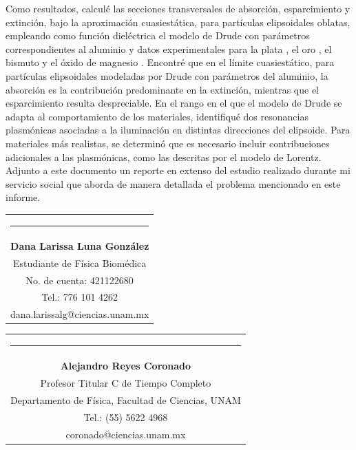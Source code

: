 \documentclass[9pt,letterpaper]{article}
\begin{document}
	Como resultados, calculé las secciones transversales de absorción, esparcimiento y extinción, bajo la aproximación cuasiestática, para partículas elipsoidales oblatas, empleando como función dieléctrica el modelo de Drude con parámetros correspondientes al aluminio \cite{Plasmonics} y datos experimentales para la plata \cite{Plata}, el oro \cite{Plata}, el bismuto \cite{Bismuto} y el óxido de magnesio \cite{MgO}. Encontré que en el límite cuasiestático, para partículas elipsoidales modeladas por Drude con parámetros del aluminio, la absorción es la contribución predominante en la extinción, mientras que el esparcimiento resulta despreciable. En el rango en el que el modelo de Drude se adapta al comportamiento de los materiales, identifiqué dos resonancias plasmónicas asociadas a
	la iluminación en distintas direcciones del elipsoide. Para materiales más realistas, se determinó que es necesario incluir contribuciones adicionales a las plasmónicas, como las descritas por el modelo de Lorentz. \\
	
	Adjunto a este documento un reporte en extenso del estudio realizado durante mi servicio social que aborda de manera detallada el problema mencionado en este informe.	\\
	
	\bigskip
	
	{\vspace{2.55cm}\begin{tabular} { c}
			\setlength{\tabcolsep}{15pt}
			\renewcommand{\arraystretch}{1}
			\noindent\rule{5.5cm}{0.4pt}\qquad \\
			
			\qquad  \textbf{Dana Larissa Luna González} \qquad \\
			\qquad Estudiante de Física Biomédica  \qquad \\ \qquad 
			No. de cuenta: 421122680\qquad \\  
			\qquad  Tel.: 776 101 4262 \qquad \\
			\qquad dana.larissalg@ciencias.unam.mx \qquad \\
			
		\end{tabular}
	}
	
	{\vspace{-2.53cm}\hspace{7cm}\begin{tabular} { c}
			\setlength{\tabcolsep}{15pt}
			\renewcommand{\arraystretch}{1}
			\noindent\rule{5.5cm}{0.4pt}\qquad \\
			
			\qquad  \textbf{Alejandro Reyes Coronado} \qquad \\
			\qquad Profesor Titular C de Tiempo Completo  \qquad \\  
			\qquad Departamento de Física, Facultad de Ciencias, UNAM\qquad \\ 
			\qquad  Tel.: (55) 5622 4968 \qquad \\
			\qquad coronado@ciencias.unam.mx \qquad \\
			
		\end{tabular}
		
	}
	
\end{document}
